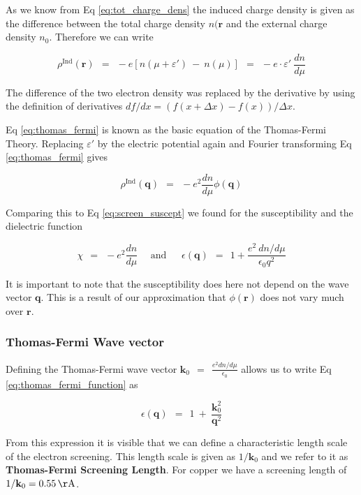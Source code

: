 \documentclass[10pt]{report}
\numberwithin{equation}{chapter}
\newcommand{\refEq}[1]{
  Eq  \ref{#1}
}
\begin{document}
As we know from \refEq{eq:tot_charge_dens} the induced charge density is given as the difference between the total charge density $n(\mathbf{r}$ and the external charge density $n_0$. Therefore we can write

\begin{equation} \label{eq:thomas_fermi}
  \rho^\text{Ind}(\mathbf{r}) ~~=~~ -e \left[ n(\mu + \varepsilon') ~-~ n(\mu) \right] 
  ~~=~~ -e \cdot \varepsilon'\ \frac{dn}{d\mu}
\end{equation}

The difference of the two electron density was replaced by the derivative by using the definition of derivatives $df/dx = (f(x+\Delta x) - f(x))/\Delta x$.
\refEq{eq:thomas_fermi} is known as the basic equation of the Thomas-Fermi Theory. Replacing $\varepsilon'$ by the electric potential again and Fourier transforming \refEq{eq:thomas_fermi} gives

\begin{equation}
  \rho^\text{Ind}(\mathbf{q}) ~~=~~ -e^2 \frac{dn}{d \mu} \phi(\mathbf{q})
\end{equation}

Comparing this to \refEq{eq:screen_suscept} we found for the susceptibility and the dielectric function

\begin{equation} \label{eq:thomas_fermi_function}
  \chi ~~=~~ -e^2 \frac{dn}{d \mu} ~~~~~~\text{and}~~~~~~~ 
  \epsilon(\mathbf{q}) ~~=~~ 1 + \frac{e^2\ dn/d\mu}{\epsilon_0 q^2}
\end{equation}

It is important to note that the susceptibility does here not depend on the wave vector $\mathbf{q}$. This is a result of our approximation that $\phi(\mathbf{r})$ does not vary much over $\mathbf{r}$.


\subsubsection{Thomas-Fermi Wave vector}

Defining the Thomas-Fermi wave vector $\mathbf{k}_0 ~~=~~ \frac{e^2 dn/d\mu}{\epsilon_0}$ allows us to write \refEq{eq:thomas_fermi_function} as 

\begin{equation} \label{eq:screening_dielect_new}
  \epsilon(\mathbf{q}) ~~=~~ 1 ~+~ \frac{\mathbf{k}_0^2}{\mathbf{q}^2}
\end{equation}

From this expression it is visible that we can define a characteristic length scale of the electron screening. This length scale is given as $1/\mathbf{k}_0$ and we refer to it as \textbf{Thomas-Fermi Screening Length}. For copper we have a screening length of $1/\mathbf{k}_0 = \SI{0.55}{\AA}$.
\end{document}
